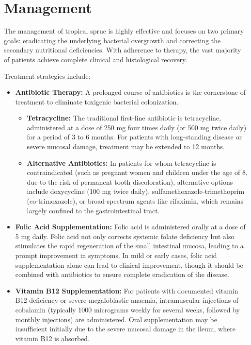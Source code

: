 \section*{Management}
The management of tropical sprue is highly effective and focuses on two primary goals: eradicating the underlying bacterial overgrowth and correcting the secondary nutritional deficiencies. With adherence to therapy, the vast majority of patients achieve complete clinical and histological recovery.

Treatment strategies include:
\begin{itemize}
    \item \textbf{Antibiotic Therapy:} A prolonged course of antibiotics is the cornerstone of treatment to eliminate toxigenic bacterial colonization.
        \begin{itemize}
            \item \textbf{Tetracycline:} The traditional first-line antibiotic is tetracycline, administered at a dose of 250 mg four times daily (or 500 mg twice daily) for a period of 3 to 6 months. For patients with long-standing disease or severe mucosal damage, treatment may be extended to 12 months.
            \item \textbf{Alternative Antibiotics:} In patients for whom tetracycline is contraindicated (such as pregnant women and children under the age of 8, due to the risk of permanent tooth discoloration), alternative options include doxycycline (100 mg twice daily), sulfamethoxazole-trimethoprim (co-trimoxazole), or broad-spectrum agents like rifaximin, which remains largely confined to the gastrointestinal tract.
        \end{itemize}
    \item \textbf{Folic Acid Supplementation:} Folic acid is administered orally at a dose of 5 mg daily. Folic acid not only corrects systemic folate deficiency but also stimulates the rapid regeneration of the small intestinal mucosa, leading to a prompt improvement in symptoms. In mild or early cases, folic acid supplementation alone can lead to clinical improvement, though it should be combined with antibiotics to ensure complete eradication of the disease.
    \item \textbf{Vitamin B12 Supplementation:} For patients with documented vitamin B12 deficiency or severe megaloblastic anaemia, intramuscular injections of cobalamin (typically 1000 micrograms weekly for several weeks, followed by monthly injections) are administered. Oral supplementation may be insufficient initially due to the severe mucosal damage in the ileum, where vitamin B12 is absorbed.

\end{itemize}
